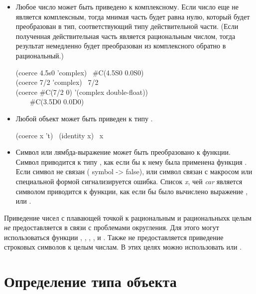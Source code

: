 \begin{defun}[Function]
\begin{itemize}
\item
Любое число может быть приведено к комплексному. Если число еще не является
комплексным, тогда мнимая часть будет равна нулю, который будет преобразован в
тип, соответствующий типу действительной части. (Если полученная действительная
часть является рациональным числом, тогда результат немедленно будет
преобразован из комплексного обратно в рациональный.)

\begin{lisp}
(coerce 4.5s0 'complex) \EV\ \#C(4.5S0 0.0S0) \\
(coerce 7/2 'complex) \EV\ 7/2 \\
(coerce \#C(7/2 0) '(complex double-float)) \\
~~~\EV\ \#C(3.5D0 0.0D0)
\end{lisp}

\item
Любой объект может быть приведен к типу .
\begin{lisp}
(coerce x 't) \EQ\ (identity x) \EQ\ x
\end{lisp}

\end{itemize}
\begin{newer}
\begin{itemize}
\item
Символ или лямбда-выражение может быть преобразовано к функции.
Символ приводится к типу , как если бы к нему была применена
функция . Если символ не связан ( symbol ->
false), или символ связан с макросом или специальной формой сигнализируется
ошибка.
Список \emph{x}, чей \emph{car} является символом  приводится к
функции, как если бы было вычислено выражение ,
или .
\end{itemize}
\end{newer}

Приведение чисел с плавающей точкой к рациональным и рациональныхк целым
\emph{не} предоставляется в связи с проблемами округления. Для этого могут
использоваться функции , ,
, ,  и . Также не предоставляется
приведение строковых символов к целым числам. В этих целях можно использовать
 или .
\end{defun}

\section{Определение типа объекта}

